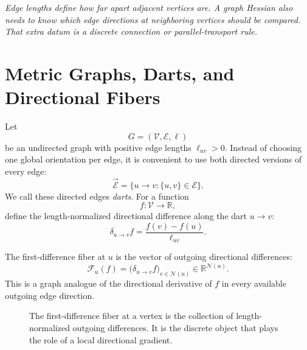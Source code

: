 \documentclass[11pt]{article}
\newcommand{\R}{\mathbb R}
\newcommand{\V}{\mathcal V}
\newcommand{\E}{\mathcal E}
\newcommand{\darts}{\overrightarrow{\mathcal E}}
\newcommand{\N}{\mathcal N}
\newcommand{\F}{\mathcal F}
\begin{document}
\begin{center}
\begin{minipage}{0.86\linewidth}
\itshape
Edge lengths define how far apart adjacent vertices are.  A graph Hessian also
needs to know which edge directions at neighboring vertices should be compared.
That extra datum is a discrete connection or parallel-transport rule.
\end{minipage}
\end{center}

\section{Metric Graphs, Darts, and Directional Fibers}

Let
\[
  G=(\V,\E,\ell)
\]
be an undirected graph with positive edge lengths \(\ell_{uv}>0\).  Instead of
choosing one global orientation per edge, it is convenient to use both directed
versions of every edge:
\[
  \darts
  =
  \{u\to v:\{u,v\}\in\E\}.
\]
We call these directed edges \emph{darts}.  For a function
\[
  f:\V\to\R,
\]
define the length-normalized directional difference along the dart \(u\to v\):
\[
  \delta_{u\to v}f
  =
  \frac{f(v)-f(u)}{\ell_{uv}}.
\]

The first-difference fiber at \(u\) is the vector of outgoing directional
differences:
\[
  \F_u(f)
  =
  \bigl(\delta_{u\to v}f\bigr)_{v\in\N(u)}
  \in \R^{\N(u)}.
\]
This is a graph analogue of the directional derivative of \(f\) in every
available outgoing edge direction.

\begin{figure}[ht]
\centering
{}
\caption{The first-difference fiber at a vertex is the collection of
length-normalized outgoing differences.  It is the discrete object that plays
the role of a local directional gradient.}
\end{figure}
\end{document}
